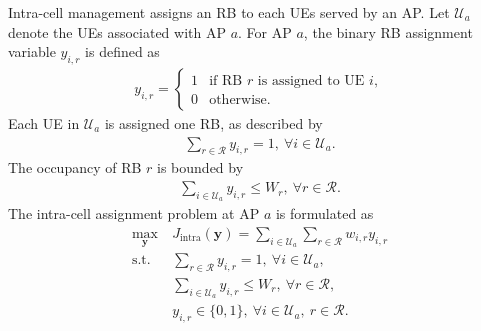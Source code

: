 \documentclass[journal]{IEEEtran}
\begin{document}
{{Intra-cell management assigns an RB to each UEs served by an AP. Let $\mathcal{U}_a$ denote the UEs associated with AP $a$. For AP $a$, the binary RB assignment variable $y_{i,r}$ is defined as
\begin{align}
y_{i,r}=
\begin{cases}
1 & \text{if RB $r$ is assigned to UE $i$},\\
0 & \text{otherwise}.
\end{cases}
\label{eq:intracell-variable}
\end{align}
Each UE in $\mathcal{U}_a$ is assigned one RB, as described by
\begin{align}
\sum_{r\in\mathcal{R}}y_{i,r}=1,~\forall i\in\mathcal{U}_a.
\label{eq:intracell-ue}
\end{align}
The occupancy of RB $r$ is bounded by
\begin{align}
\sum_{i\in\mathcal{U}_a}y_{i,r}\leq W_r,~\forall r\in\mathcal{R}. \label{eq:intracell-rb}
\end{align}
The intra-cell assignment problem at AP $a$ is formulated as
\begin{align}
\max_{\bm y}~
&J_{\mathrm{intra}}(\bm y)
=\sum_{i\in\mathcal{U}_a}\sum_{r\in\mathcal{R}}w_{i,r}y_{i,r}
\nonumber\\
\mathrm{s.t.}~
&\sum_{r\in\mathcal{R}}y_{i,r}=1,~\forall i\in\mathcal{U}_a,
\nonumber\\
&\sum_{i\in\mathcal{U}_a}y_{i,r}\leq W_r,~\forall r\in\mathcal{R},
\nonumber\\
&y_{i,r}\in\{0,1\},~\forall i\in\mathcal{U}_a,~r\in\mathcal{R}.
\label{eq:intra-assignment}
\end{align}

}}
\end{document}
